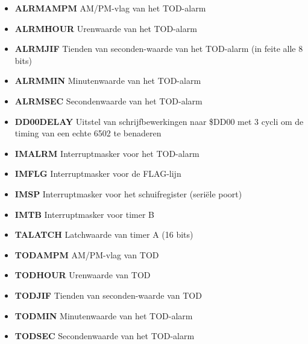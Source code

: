 \begin{itemize}
\item{\bf{ALRMAMPM}} AM/PM-vlag van het TOD-alarm
\item{\bf{ALRMHOUR}} Urenwaarde van het TOD-alarm
\item{\bf{ALRMJIF}} Tienden van seconden-waarde van het TOD-alarm (in feite alle 8 bits)
\item{\bf{ALRMMIN}} Minutenwaarde van het TOD-alarm
\item{\bf{ALRMSEC}} Secondenwaarde van het TOD-alarm
\item{\bf{DD00DELAY}} Uitstel van schrijfbewerkingen naar \$DD00 met 3 cycli om de timing van een echte 6502 te benaderen
\item{\bf{IMALRM}} Interruptmasker voor het TOD-alarm
\item{\bf{IMFLG}} Interruptmasker voor de FLAG-lijn
\item{\bf{IMSP}} Interruptmasker voor het schuifregister (seriële poort)
\item{\bf{IMTB}} Interruptmasker voor timer B
\item{\bf{TALATCH}} Latchwaarde van timer A (16 bits)
\item{\bf{TODAMPM}} AM/PM-vlag van TOD
\item{\bf{TODHOUR}} Urenwaarde van TOD
\item{\bf{TODJIF}} Tienden van seconden-waarde van TOD
\item{\bf{TODMIN}} Minutenwaarde van het TOD-alarm
\item{\bf{TODSEC}} Secondenwaarde van het TOD-alarm
\end{itemize}
